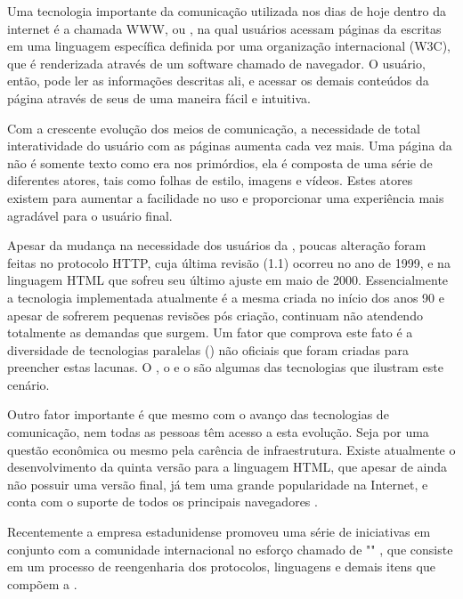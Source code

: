 \documentclass[espaco=simples,appendix=Name]{abnt}
\begin{document}
Uma tecnologia importante da comunicação utilizada nos dias de hoje dentro da internet é a chamada WWW, ou , na qual usuários acessam páginas da  escritas em uma linguagem específica definida por uma organização internacional (W3C), que é renderizada através de um software chamado de navegador. O usuário, então, pode ler as informações descritas ali, e acessar os demais conteúdos da página através de seus  de uma maneira fácil e intuitiva.

Com a crescente evolução dos meios de comunicação, a necessidade de total interatividade do usuário com as páginas aumenta cada vez mais. Uma página da  não é somente texto como era nos primórdios, ela é composta de uma série de diferentes atores, tais como folhas de estilo, imagens e vídeos. Estes atores existem para aumentar a facilidade no uso e proporcionar uma experiência mais agradável para o usuário final.

Apesar da mudança na necessidade dos usuários da , poucas alteração foram feitas no protocolo HTTP, cuja última revisão (1.1) ocorreu no ano de 1999, e na linguagem HTML que sofreu seu último ajuste em maio de 2000. Essencialmente a tecnologia implementada atualmente é a mesma criada no início dos anos 90 e apesar de sofrerem pequenas revisões pós criação, continuam não atendendo totalmente as demandas que surgem. Um fator que comprova este fato é a diversidade de tecnologias paralelas () não oficiais que foram criadas para preencher estas lacunas. O , o  e o  são algumas das tecnologias que ilustram este cenário.

Outro fator importante é que mesmo com o avanço das tecnologias de comunicação, nem todas as pessoas têm acesso a esta evolução. Seja por uma questão econômica ou mesmo pela carência de infraestrutura. Existe atualmente o desenvolvimento da quinta versão para a linguagem HTML, que apesar de ainda não possuir uma versão final, já tem uma grande popularidade na Internet, e conta com o suporte de todos os principais navegadores \cite{W3schoolsHTML5}.

Recentemente a empresa estadunidense  promoveu uma série de iniciativas em conjunto com a comunidade internacional no esforço chamado de "" \cite{WebFaster}, que consiste em um processo de reengenharia dos protocolos, linguagens e demais itens que compõem a . 
\end{document}
